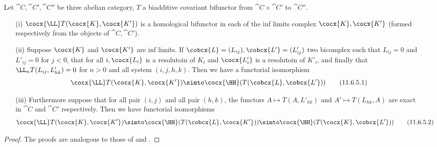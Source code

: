 \begin{proposition}[11.6.5]
Let $\cat{C}, \cat{C'}, \cat{C''}$ be three abelian category, $T$ a biadditive covariant bifunctor from $\cat{C}\times \cat{C'}$ to $\cat{C''}$.
\begin{enumerate}
  \item[(i)] $\cocx{\LL} T(\cocx{K}, \cocx{K'})$ is a homological bifunctor in each of the inf limits complex $\cocx{K}, \cocx{K'}$ (formed respectively from the objects of $\cat{C}, \cat{C'}$).
  \item[(ii)] Suppose $\cocx{K}$ and $\cocx{K'}$ are inf limits. If $\cobcx{L} = (L_{ij}), \cobcx{L'} = (L'_{ij})$ two bicomplex such that $L_{ij} = 0$ and $L'_{ij} = 0$ for $j<0$, 
  that for all $i, \cocx{L_i}$ is a resolutoin of $K_i$ and $\cocx{L'_i}$ is a resolutoin of $K'_i$, and finally that $\LL_n T(L_{ij}, L'_{hk}) = 0$ for $n>0$ and all system $(i,j,h,k)$.
  Then we have a functorial isomorphism
  \[
    \label{0.11.6.5.1}
    \cocx{\LL} T(\cocx{K}, \cocx{K'}) \simto \cocx{\HH}(T(\cobcx{L}, \cobcx{L'}))
    \tag{11.6.5.1}
  \]
  \item[(iii)] Furthermore suppose that for all pair $(i,j)$ and all pair $(h,k)$, the functors $A\mapsto T(A,L'_{hk})$ and $A'\mapsto T(L_{hk}, A)$ are exact in $\cat{C}$ and $\cat{C'}$ respectively.
  Then we have functorial isomorphisms
  \[
    \label{0.11.6.5.2}
    \cocx{\LL} T(\cocx{K}, \cocx{K'}) \simto \cocx{\HH}(T(\cobcx{L}, \cocx{K'}))\simto \cocx{\HH}(T(\cocx{K}, \cobcx{L'}))
    \tag{11.6.5.2}
  \]
\end{enumerate}
\end{proposition}
\begin{proof}
The proofs are analogous to those of  and .
\end{proof}

